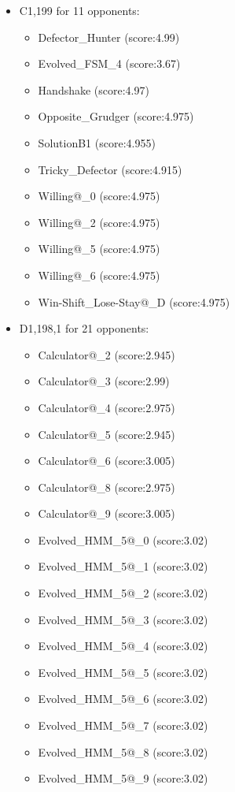 \begin{appendices}
\begin{itemize}
        \item C1,199 for 11 opponents:
        \begin{multicols}{3}
            \begin{itemize}
                \item Defector\_Hunter (score:4.99)
                \item Evolved\_FSM\_4 (score:3.67)
                \item Handshake (score:4.97)
                \item Opposite\_Grudger (score:4.975)
                \item SolutionB1 (score:4.955)
                \item Tricky\_Defector (score:4.915)
                \item Willing@\_0 (score:4.975)
                \item Willing@\_2 (score:4.975)
                \item Willing@\_5 (score:4.975)
                \item Willing@\_6 (score:4.975)
                \item Win-Shift\_Lose-Stay@\_D (score:4.975)
            \end{itemize}
        \end{multicols}

        \item D1,198,1 for 21 opponents:
        \begin{multicols}{3}
            \begin{itemize}
                \item Calculator@\_2 (score:2.945)
                \item Calculator@\_3 (score:2.99)
                \item Calculator@\_4 (score:2.975)
                \item Calculator@\_5 (score:2.945)
                \item Calculator@\_6 (score:3.005)
                \item Calculator@\_8 (score:2.975)
                \item Calculator@\_9 (score:3.005)
                \item Evolved\_HMM\_5@\_0 (score:3.02)
                \item Evolved\_HMM\_5@\_1 (score:3.02)
                \item Evolved\_HMM\_5@\_2 (score:3.02)
                \item Evolved\_HMM\_5@\_3 (score:3.02)
                \item Evolved\_HMM\_5@\_4 (score:3.02)
                \item Evolved\_HMM\_5@\_5 (score:3.02)
                \item Evolved\_HMM\_5@\_6 (score:3.02)
                \item Evolved\_HMM\_5@\_7 (score:3.02)
                \item Evolved\_HMM\_5@\_8 (score:3.02)
                \item Evolved\_HMM\_5@\_9 (score:3.02)


\end{itemize}
\end{multicols}
\end{itemize}
\end{appendices}
